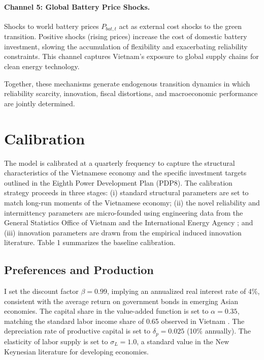 \documentclass[12pt, a4paper]{article}
\begin{document}
	\paragraph{Channel 5: Global Battery Price Shocks.}
	Shocks to world battery prices $P_{bat,t}$ act as external cost shocks to the green transition. Positive shocks (rising prices) increase the cost of domestic battery investment, slowing the accumulation of flexibility and exacerbating reliability constraints. This channel captures Vietnam's exposure to global supply chains for clean energy technology.
	
	Together, these mechanisms generate endogenous transition dynamics in which reliability scarcity, innovation, fiscal distortions, and macroeconomic performance are jointly determined.
	
	\section{Calibration} \label{sec:calibration}
	
	The model is calibrated at a quarterly frequency to capture the structural characteristics of the Vietnamese economy and the specific investment targets outlined in the Eighth Power Development Plan (PDP8). The calibration strategy proceeds in three stages: (i) standard structural parameters are set to match long-run moments of the Vietnamese economy; (ii) the novel reliability and intermittency parameters are micro-founded using engineering data from the General Statistics Office of Vietnam \citep{gso2024} and the International Energy Agency \citep{iea2023}; and (iii) innovation parameters are drawn from the empirical induced innovation literature. Table 1 summarizes the baseline calibration.
	
	\subsection{Preferences and Production}
	I set the discount factor $\beta = 0.99$, implying an annualized real interest rate of 4\%, consistent with the average return on government bonds in emerging Asian economies. The capital share in the value-added function is set to $\alpha = 0.35$, matching the standard labor income share of 0.65 observed in Vietnam \citep{gso2024}. The depreciation rate of productive capital is set to $\delta_p = 0.025$ (10\% annually). The elasticity of labor supply is set to $\sigma_L = 1.0$, a standard value in the New Keynesian literature for developing economies.
	
\end{document}
